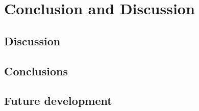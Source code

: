 \chapter{Conclusion and Discussion} \label{cap:conclusions}

\section{Discussion}

\section{Conclusions}

\section{Future development}

